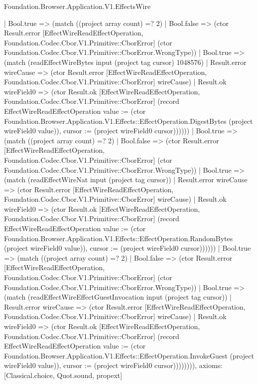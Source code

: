 \begin{lexlean}{Foundation.Browser.Application.V1.EffectsWire}
\begin{semanticmodule}
{            | Bool.true => (match ((project array count) =? 2)
              | Bool.false => (ctor Result.error [EffectWireReadEffectOperation, Foundation.Codec.Cbor.V1.Primitive::CborError] (ctor Foundation.Codec.Cbor.V1.Primitive::CborError.WrongType))
              | Bool.true => (match (readEffectWireBytes input (project tag cursor) 1048576)
                | Result.error wireCause => (ctor Result.error [EffectWireReadEffectOperation, Foundation.Codec.Cbor.V1.Primitive::CborError] wireCause)
                | Result.ok wireField0 => (ctor Result.ok [EffectWireReadEffectOperation, Foundation.Codec.Cbor.V1.Primitive::CborError] (record EffectWireReadEffectOperation {value := (ctor Foundation.Browser.Application.V1.Effects::EffectOperation.DigestBytes (project wireField0 value)), cursor := (project wireField0 cursor)})))))
          | Bool.true => (match ((project array count) =? 2)
            | Bool.false => (ctor Result.error [EffectWireReadEffectOperation, Foundation.Codec.Cbor.V1.Primitive::CborError] (ctor Foundation.Codec.Cbor.V1.Primitive::CborError.WrongType))
            | Bool.true => (match (readEffectWireNat input (project tag cursor))
              | Result.error wireCause => (ctor Result.error [EffectWireReadEffectOperation, Foundation.Codec.Cbor.V1.Primitive::CborError] wireCause)
              | Result.ok wireField0 => (ctor Result.ok [EffectWireReadEffectOperation, Foundation.Codec.Cbor.V1.Primitive::CborError] (record EffectWireReadEffectOperation {value := (ctor Foundation.Browser.Application.V1.Effects::EffectOperation.RandomBytes (project wireField0 value)), cursor := (project wireField0 cursor)})))))
        | Bool.true => (match ((project array count) =? 2)
          | Bool.false => (ctor Result.error [EffectWireReadEffectOperation, Foundation.Codec.Cbor.V1.Primitive::CborError] (ctor Foundation.Codec.Cbor.V1.Primitive::CborError.WrongType))
          | Bool.true => (match (readEffectWireEffectGuestInvocation input (project tag cursor))
            | Result.error wireCause => (ctor Result.error [EffectWireReadEffectOperation, Foundation.Codec.Cbor.V1.Primitive::CborError] wireCause)
            | Result.ok wireField0 => (ctor Result.ok [EffectWireReadEffectOperation, Foundation.Codec.Cbor.V1.Primitive::CborError] (record EffectWireReadEffectOperation {value := (ctor Foundation.Browser.Application.V1.Effects::EffectOperation.InvokeGuest (project wireField0 value)), cursor := (project wireField0 cursor)}))))))),
  axioms: [Classical.choice, Quot.sound, propext]
}


\end{semanticmodule}
\end{lexlean}
